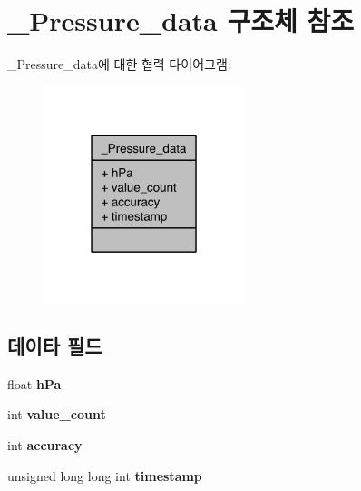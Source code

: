 \hypertarget{struct__Pressure__data}{\section{\-\_\-\-Pressure\-\_\-data 구조체 참조}
\label{struct__Pressure__data}
}


\-\_\-\-Pressure\-\_\-data에 대한 협력 다이어그램\-:\nopagebreak
\begin{figure}[H]
\begin{center}
\leavevmode
\includegraphics[width=166pt]{d3/d60/struct__Pressure__data__coll__graph}
\end{center}
\end{figure}
\subsection*{데이타 필드}
\begin{DoxyCompactItemize}
\item 
\hypertarget{struct__Pressure__data_af5bafbc5db27b95f2b41516f5f61336f}{float {\bfseries h\-Pa}}\label{struct__Pressure__data_af5bafbc5db27b95f2b41516f5f61336f}

\item 
\hypertarget{struct__Pressure__data_a40a079bfc72408819dc78da308203a74}{int {\bfseries value\-\_\-count}}\label{struct__Pressure__data_a40a079bfc72408819dc78da308203a74}

\item 
\hypertarget{struct__Pressure__data_a5565cf9073275f9713f9016e7c10d25f}{int {\bfseries accuracy}}\label{struct__Pressure__data_a5565cf9073275f9713f9016e7c10d25f}

\item 
\hypertarget{struct__Pressure__data_a8de02c4128636a7bf630ff5428f60c8d}{unsigned long long int {\bfseries timestamp}}\label{struct__Pressure__data_a8de02c4128636a7bf630ff5428f60c8d}

\end{DoxyCompactItemize}



